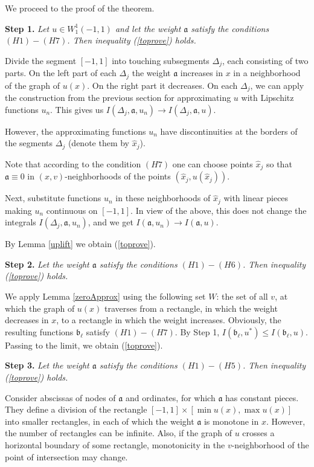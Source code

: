 \documentclass[12pt]{article}
\renewcommand{\le}{\leqslant}
\newcommand{\W}{W_1^1}
\begin{document}
We proceed to the proof of the theorem.

\bigskip
{\bf Step 1.} {\it Let $u \in \W(-1, 1)$ and let the weight $\mathfrak a$ satisfy the conditions $(H1)-(H7)$.
Then inequality (\ref{toprove}) holds.}

Divide the segment $[-1, 1]$ into touching subsegments $\Delta_j$, each consisting of two parts.
On the left part of each $\Delta_j$ the weight $\mathfrak a$ increases in $x$ in a neighborhood
of the graph of $u(x)$. On the right part it decreases.
On each $\Delta_j$, we can apply the construction from the previous section
for approximating $u$ with Lipschitz functions $u_n$.
This gives us $I(\Delta_j, \mathfrak a, u_n) \to I(\Delta_j, \mathfrak a, u)$.

However, the approximating functions $u_n$ have discontinuities at the borders of the segments $\Delta_j$
(denote them by $\hat{x}_j$).

Note that according to the condition $(H7)$ one can choose points $\hat{x}_j$ so
that $\mathfrak a \equiv 0$ in $(x, v)$-neighborhoods of the points $(\hat{x}_j, u(\hat{x}_j))$.

Next, substitute functions $u_n$ in these neighborhoods of $\hat{x}_j$ with linear pieces
making $u_n$ continuous on $[-1, 1]$.
In view of the above, this does not change the integrals $I(\Delta_j, \mathfrak a, u_n)$,
and we get $I(\mathfrak a, u_n) \to I(\mathfrak a, u)$.

By Lemma \ref{uplift} we obtain (\ref{toprove}).

\bigskip

{\bf Step 2.} {\it Let the weight $\mathfrak a$ satisfy the conditions $(H1)-(H6)$.
Then inequality (\ref{toprove}) holds.}

We apply Lemma \ref{zeroApprox} using the following set $W$:
the set of all $v$, at which the graph of $u(x)$ traverses from a rectangle,
in which the weight decreases in $x$,
to a rectangle in which the weight increases.
Obviously, the resulting functions $\mathfrak b_{\ell}$ satisfy $(H1)-(H7)$.
By Step 1, $I(\mathfrak b_{\ell}, u^*) \le I(\mathfrak b_{\ell}, u)$.
Passing to the limit, we obtain (\ref{toprove}).

\bigskip

{\bf Step 3.} {\it Let the weight $\mathfrak a$ satisfy the conditions $(H1)-(H5)$.
Then inequality (\ref{toprove}) holds.}

Consider abscissas of nodes of $\mathfrak a$
and ordinates, for which $\mathfrak a$ has constant pieces.
They define a division of the rectangle $[-1, 1] \times [\min u(x), \max u(x)]$
into smaller rectangles, in each of which the weight $\mathfrak a$ is monotone in $x$.
However, the number of rectangles can be infinite.
Also, if the graph of $u$ crosses a horizontal boundary of some rectangle,
monotonicity in the $v$-neighborhood of the point of intersection may change.
\end{document}
